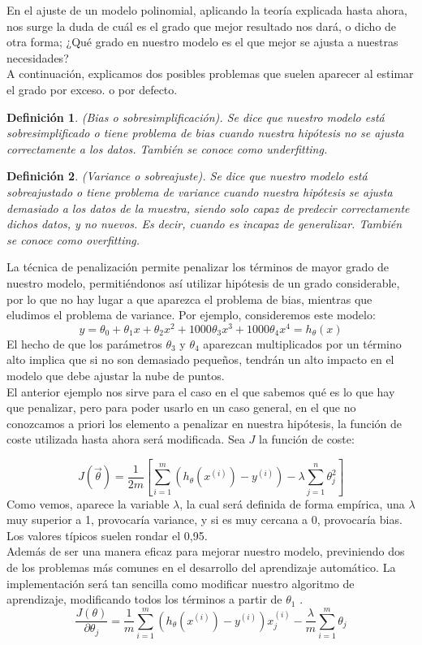 \documentclass[a4paper,10pt]{article}
\newtheorem{definition}{Definición}
\begin{document}
En el ajuste de un modelo polinomial, aplicando la teoría explicada hasta ahora, nos surge la duda de cuál es el grado que mejor resultado nos dará, o dicho de otra forma; ¿Qué grado en nuestro modelo es el que mejor se ajusta a nuestras necesidades?\\ A continuación, explicamos dos posibles problemas que suelen aparecer al estimar el grado por exceso.
o por defecto.\\
\begin{definition}(Bias o sobresimplificación). Se dice que nuestro modelo está
sobresimplificado o tiene problema de bias cuando nuestra hipótesis no se ajusta
correctamente a los datos. También se conoce como \textit{underfitting}.

\end{definition}
\begin{definition}(Variance o sobreajuste). Se dice que nuestro modelo está sobreajustado o tiene problema de variance cuando nuestra hipótesis se ajusta demasiado a los datos de la muestra, siendo solo capaz de predecir correctamente
dichos datos, y no nuevos. Es decir, cuando es incapaz de generalizar. También
se conoce como \textit{overfitting}.


\end{definition}
La técnica de penalización permite penalizar los términos de mayor grado de nuestro modelo, permitiéndonos así utilizar hipótesis de un grado considerable, por lo que no hay lugar a que aparezca el problema de bias, mientras que eludimos el problema de variance. Por ejemplo, consideremos este modelo:
\[
 y=\theta_0+\theta_1 x+\theta_2 x^2+1000\theta_3 x^3+1000\theta_4 x^4 = h_\theta (x)
\]
El hecho de que los parámetros $\theta_3$ y $\theta_4$ aparezcan multiplicados por un término
alto implica que si no son demasiado pequeños, tendrán un alto impacto en el
modelo que debe ajustar la nube de puntos.\\
El anterior ejemplo nos sirve para el caso en el que sabemos qué es lo que hay que penalizar, pero para poder usarlo en un caso general, en el que no conozcamos a priori los elemento a penalizar en nuestra hipótesis, la función de coste utilizada hasta ahora será modificada. Sea $J$ la función de coste:

\[
J(\vec{\theta})=\frac{1}{2m}\left[\sum_{i=1}^{m} \left(h_\theta (x^{(i)})-y^{(i)}\right)-\lambda \sum_{j=1}^{n}\theta_{j}^2\right]
\]
Como vemos, aparece la variable $\lambda$, la cual será definida de forma empírica, una $\lambda$ muy superior a 1, provocaría variance, y si es muy cercana a 0, provocaría bias. Los valores típicos suelen rondar el 0,95.\\
Además de ser una manera eficaz para mejorar nuestro modelo, previniendo dos de los problemas más comunes en el desarrollo del aprendizaje automático. La implementación será tan sencilla como modificar nuestro algoritmo de aprendizaje, modificando todos los términos a partir de $\theta_1$ .\\
\[
\frac{J(\theta)}{\partial\theta_j} = \frac{1}{m} \sum_{i=1}^{m} \left(h_\theta (x^{(i)})-y^{(i)}\right) x_{j}^{(i)}-\frac{\lambda}{m} \sum_{i=1}^{m} \theta_j 
\]
\end{document}
